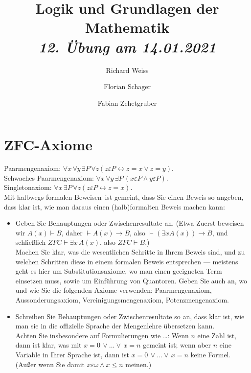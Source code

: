 \documentclass{article}
\title
{
  Logik und Grundlagen der Mathematik \\
  \vspace{4pt}
  \normalsize
  \textit{12. Übung am 14.01.2021}
}
\author
{
  Richard Weiss
  \and
  Florian Schager
  \and
  Fabian Zehetgruber
}
\date{}
\begin{document}
\maketitle

\section*{ZFC-Axiome}

Paarmengenaxiom: $\forall x\, \forall y\, \exists P \, \forall z
(z \varepsilon P \leftrightarrow z = x \lor z = y)$. \\
Schwaches Paarmengenaxiom: $\forall x\, \forall y\, \exists P\, (x \varepsilon P \land y \varepsilon P)$. \\
Singletonaxiom: $\forall x \, \exists P \, \forall z (z \varepsilon P \leftrightarrow z = x)$. \\
Mit \glqq halbwegs formalen Beweisen\grqq\ ist gemeint, dass Sie einen Beweis so
angeben, dass klar ist, wie man daraus einen (halb)formalten Beweis machen kann:
\begin{itemize}
  \item Geben Sie Behauptungen oder Zwischenresultate an. (Etwa \glqq Zuerst beweisen
  wir $A(x) \vdash B$, daher $\vdash A(x) \rightarrow B$, also $\vdash (\exists x A(x)) \rightarrow B$,
  und schließlich $ZFC \vdash \exists x \, A(x)$, also $ZFC \vdash B$.\grqq) \\
  Machen Sie klar, was die wesentlichen Schritte in Ihrem Beweis sind, und zu
  welchen Schritten diese in einem formalen Beweis entsprechen --- meistens
  geht es hier um Substitutionsaxiome, wo man einen geeigneten Term einsetzen muss,
  sowie um Einführung von Quantoren. Geben Sie auch an, wo und wie Sie die folgenden
  Axiome verwenden: Paarmengenaxiom, Aussonderungsaxiom, Vereinigungsmengenaxiom,
  Potenzmengenaxiom.
  \item Schreiben Sie Behauptungen oder Zwischenresultate so an, dass klar ist,
  wie man sie in die offizielle Sprache der Mengenlehre übersetzen kann. \\
  Achten Sie insbesondere auf Formulierungen wie \glqq\dots\grqq: Wenn $n$ eine
  Zahl ist, dann ist klar, was mit $x = 0\, \lor \dots \lor\, x = n$ gemeint ist;
  wenn aber $n$ eine Variable in Ihrer Sprache ist, dann ist $x = 0\, \lor \dots \lor\, x = n$
  keine Formel. (Außer wenn Sie damit $x \varepsilon \omega \land x \leq n$ meinen.)
\end{itemize}





\end{document}
